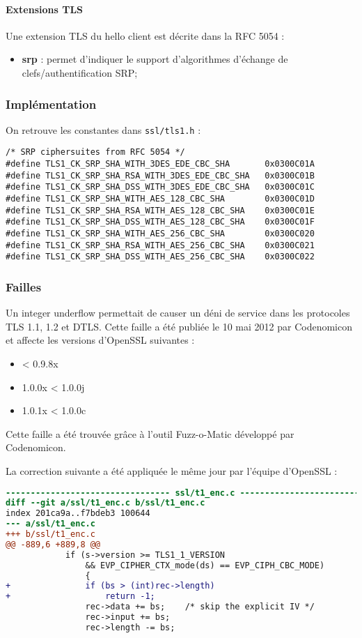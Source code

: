 \paragraph{Extensions TLS}
Une extension TLS du hello client est décrite dans la RFC 5054 :
\begin{itemize}
\item \textbf{srp} : permet d'indiquer le support d'algorithmes d'échange de clefs/authentification SRP;
\end{itemize}

\subsubsection{Implémentation}

On retrouve les constantes dans \verb+ssl/tls1.h+ : 
\begin{verbatim}
/* SRP ciphersuites from RFC 5054 */
#define TLS1_CK_SRP_SHA_WITH_3DES_EDE_CBC_SHA       0x0300C01A
#define TLS1_CK_SRP_SHA_RSA_WITH_3DES_EDE_CBC_SHA   0x0300C01B
#define TLS1_CK_SRP_SHA_DSS_WITH_3DES_EDE_CBC_SHA   0x0300C01C
#define TLS1_CK_SRP_SHA_WITH_AES_128_CBC_SHA        0x0300C01D
#define TLS1_CK_SRP_SHA_RSA_WITH_AES_128_CBC_SHA    0x0300C01E
#define TLS1_CK_SRP_SHA_DSS_WITH_AES_128_CBC_SHA    0x0300C01F
#define TLS1_CK_SRP_SHA_WITH_AES_256_CBC_SHA        0x0300C020
#define TLS1_CK_SRP_SHA_RSA_WITH_AES_256_CBC_SHA    0x0300C021
#define TLS1_CK_SRP_SHA_DSS_WITH_AES_256_CBC_SHA    0x0300C022
\end{verbatim}

\subsubsection{Failles}

Un integer underflow permettait de causer un déni de service dans les protocoles TLS 1.1, 1.2 et DTLS. Cette faille \cite{CVE20122333} a été publiée le 10 mai 2012 par Codenomicon et affecte les versions d'OpenSSL suivantes :
\begin{itemize}
\item < 0.9.8x
\item 1.0.0x < 1.0.0j
\item 1.0.1x < 1.0.0c
\end{itemize}

Cette faille a été trouvée grâce à l'outil Fuzz-o-Matic développé par Codenomicon.

La correction suivante a été appliquée le même jour par l'équipe d'OpenSSL :
\begin{lstlisting}[language=diff]
--------------------------------- ssl/t1_enc.c --------------------------------
diff --git a/ssl/t1_enc.c b/ssl/t1_enc.c
index 201ca9a..f7bdeb3 100644
--- a/ssl/t1_enc.c
+++ b/ssl/t1_enc.c
@@ -889,6 +889,8 @@
            if (s->version >= TLS1_1_VERSION
                && EVP_CIPHER_CTX_mode(ds) == EVP_CIPH_CBC_MODE)
                {
+               if (bs > (int)rec->length)
+                   return -1;
                rec->data += bs;    /* skip the explicit IV */
                rec->input += bs;
                rec->length -= bs;
\end{lstlisting}


